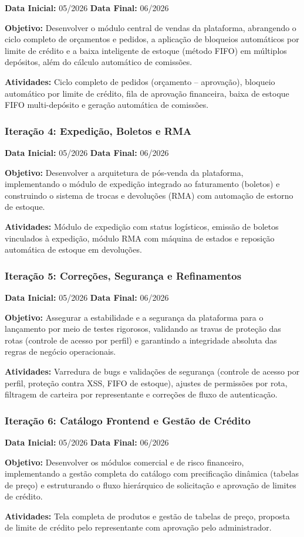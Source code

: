 \documentclass[12pt,a4paper]{article}
\begin{document}
\textbf{Data Inicial:} 05/2026 \quad \textbf{Data Final:} 06/2026

\textbf{Objetivo:} Desenvolver o módulo central de vendas da plataforma, abrangendo o ciclo completo de orçamentos e pedidos, a aplicação de bloqueios automáticos por limite de crédito e a baixa inteligente de estoque (método FIFO) em múltiplos depósitos, além do cálculo automático de comissões.

\textbf{Atividades:} Ciclo completo de pedidos (orçamento -- aprovação), bloqueio automático por limite de crédito, fila de aprovação financeira, baixa de estoque FIFO multi-depósito e geração automática de comissões.

\subsubsection*{Iteração 4: Expedição, Boletos e RMA}

\textbf{Data Inicial:} 05/2026 \quad \textbf{Data Final:} 06/2026

\textbf{Objetivo:} Desenvolver a arquitetura de pós-venda da plataforma, implementando o módulo de expedição integrado ao faturamento (boletos) e construindo o sistema de trocas e devoluções (RMA) com automação de estorno de estoque.

\textbf{Atividades:} Módulo de expedição com status logísticos, emissão de boletos vinculados à expedição, módulo RMA com máquina de estados e reposição automática de estoque em devoluções.

\subsubsection*{Iteração 5: Correções, Segurança e Refinamentos}

\textbf{Data Inicial:} 05/2026 \quad \textbf{Data Final:} 06/2026

\textbf{Objetivo:} Assegurar a estabilidade e a segurança da plataforma para o lançamento por meio de testes rigorosos, validando as travas de proteção das rotas (controle de acesso por perfil) e garantindo a integridade absoluta das regras de negócio operacionais.

\textbf{Atividades:} Varredura de bugs e validações de segurança (controle de acesso por perfil, proteção contra XSS, FIFO de estoque), ajustes de permissões por rota, filtragem de carteira por representante e correções de fluxo de autenticação.

\subsubsection*{Iteração 6: Catálogo Frontend e Gestão de Crédito}

\textbf{Data Inicial:} 05/2026 \quad \textbf{Data Final:} 06/2026

\textbf{Objetivo:} Desenvolver os módulos comercial e de risco financeiro, implementando a gestão completa do catálogo com precificação dinâmica (tabelas de preço) e estruturando o fluxo hierárquico de solicitação e aprovação de limites de crédito.

\textbf{Atividades:} Tela completa de produtos e gestão de tabelas de preço, proposta de limite de crédito pelo representante com aprovação pelo administrador.
\end{document}
